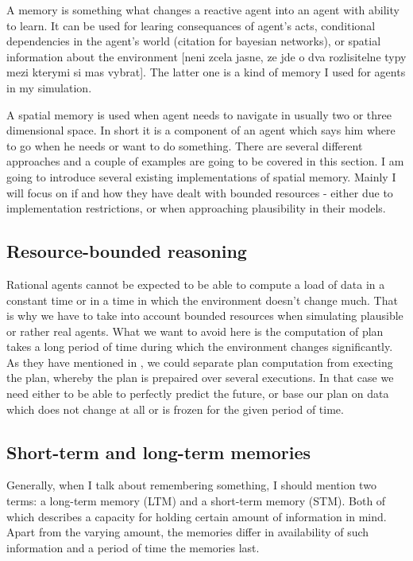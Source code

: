 A memory is something what changes a reactive agent into an agent with ability to learn. It can be used for learing consequances of agent's acts, conditional dependencies in the agent's world (citation for bayesian networks), or spatial information about the environment [neni zcela jasne, ze jde o dva rozlisitelne typy mezi kterymi si mas vybrat]. The latter one is a kind of memory I used for agents in my simulation. 

A spatial memory is used when agent needs to navigate in usually two or three dimensional space. In short it is a component of an agent which says him where to go when he needs or want to do something. There are several different approaches and a couple of examples are going to be covered in this section. I am going to introduce several existing implementations of spatial memory. Mainly I will focus on if and how they have dealt with bounded resources - either due to implementation restrictions, or when approaching plausibility in their models. 

\subsection{Resource-bounded reasoning}

Rational agents cannot be expected to be able to compute a load of data in a constant time or in a time in which the environment doesn't change much. That is why we have to take into account bounded resources when simulating plausible or rather real agents. What we want to avoid here is the computation of plan takes a long period of time during which the environment changes significantly. As they have mentioned in \cite{Bratman:practicalreasoning}, we could separate plan computation from execting the plan, whereby the plan is prepaired over several executions. In that case we need either to be able to perfectly predict the future, or base our plan on data which does not change at all or is frozen for the given period of time.

\subsection{Short-term and long-term memories}

Generally, when I talk about remembering something, I should mention two terms: a long-term memory (LTM) and a short-term memory (STM). Both of which describes a capacity for holding certain amount of information in mind. Apart from the varying amount, the memories differ in availability of such information and a period of time the memories last.       

